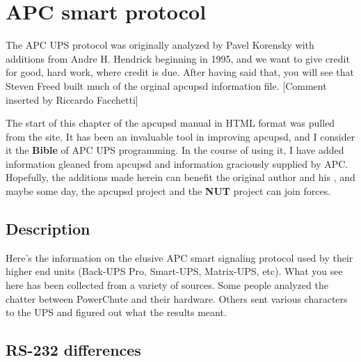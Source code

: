 {{{{{{{{{\label{APC-smart-protocol}

\section*{APC smart protocol}

\label{index-Smart-protocol-262}
\label{index-Protocol-Smart-263}
The APC UPS protocol was originally analyzed by Pavel Korensky with additions
from Andre H. Hendrick beginning in 1995, and we want to give credit for good,
hard work, where credit is due. After having said that, you will see that
Steven Freed built much of the orginal apcupsd information file. [Comment
inserted by Riccardo Facchetti]  

The start of this chapter of the apcupsd manual in HTML format was pulled from
the 
 site. It has been an
invaluable tool in improving apcupsd, and I consider it the {\bf Bible} of APC
UPS programming. In the course of using it, I have added information gleaned
from apcupsd and information graciously supplied by APC. Hopefully, the
additions made herein can benefit the original author and his 
, and maybe some day,
the apcupsd project and the {\bf NUT} project can join forces. 

\label{Description}

\subsection*{Description}

Here's the information on the elusive APC smart signaling protocol used by
their higher end units (Back-UPS Pro, Smart-UPS, Matrix-UPS, etc). What you
see here has been collected from a variety of sources. Some people analyzed
the chatter between PowerChute and their hardware. Others sent various
characters to the UPS and figured out what the results meant. 

\label{RS_002d232-differences}

\subsection*{RS-232 differences}

}}}}}}}}}
